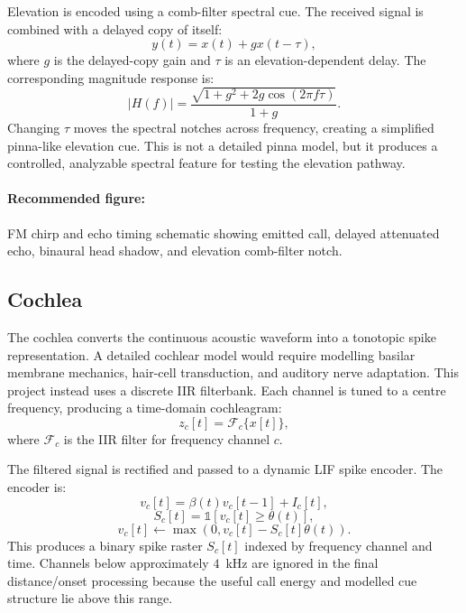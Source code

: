 Elevation is encoded using a comb-filter spectral cue. The received signal is combined with a delayed copy of itself:
\begin{equation}
    y(t)=x(t)+g x(t-\tau),
\end{equation}
where $g$ is the delayed-copy gain and $\tau$ is an elevation-dependent delay. The corresponding magnitude response is:
\begin{equation}
    |H(f)| = \frac{\sqrt{1+g^2+2g\cos(2\pi f \tau)}}{1+g}.
\end{equation}
Changing $\tau$ moves the spectral notches across frequency, creating a simplified pinna-like elevation cue. This is not a detailed pinna model, but it produces a controlled, analyzable spectral feature for testing the elevation pathway.

\paragraph{Recommended figure:} FM chirp and echo timing schematic showing emitted call, delayed attenuated echo, binaural head shadow, and elevation comb-filter notch.

\subsection{Cochlea}

The cochlea converts the continuous acoustic waveform into a tonotopic spike representation. A detailed cochlear model would require modelling basilar membrane mechanics, hair-cell transduction, and auditory nerve adaptation. This project instead uses a discrete IIR filterbank. Each channel is tuned to a centre frequency, producing a time-domain cochleagram:
\begin{equation}
    z_c[t] = \mathcal{F}_c\{x[t]\},
\end{equation}
where $\mathcal{F}_c$ is the IIR filter for frequency channel $c$.

The filtered signal is rectified and passed to a dynamic LIF spike encoder. The encoder is:
\begin{equation}
    v_c[t] = \beta(t)v_c[t-1] + I_c[t],
\end{equation}
\begin{equation}
    S_c[t] = \mathbb{1}\left[v_c[t] \geq \theta(t)\right],
\end{equation}
\begin{equation}
    v_c[t] \leftarrow \max(0, v_c[t] - S_c[t]\theta(t)).
\end{equation}
This produces a binary spike raster $S_c[t]$ indexed by frequency channel and time. Channels below approximately $4$~kHz are ignored in the final distance/onset processing because the useful call energy and modelled cue structure lie above this range.

